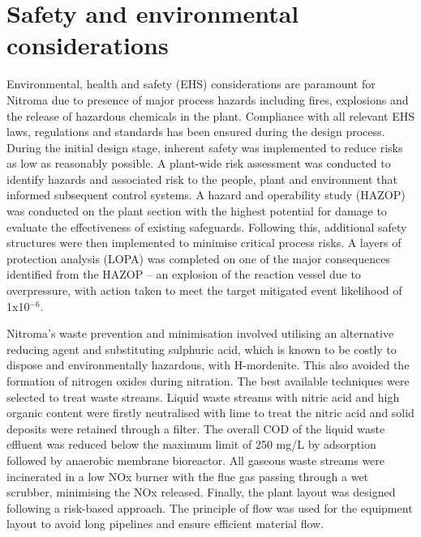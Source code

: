\section*{Safety and environmental considerations}

Environmental, health and safety (EHS) considerations are paramount for Nitroma due to presence of major process hazards including fires, explosions and the release of hazardous chemicals in the plant. Compliance with all relevant EHS laws, regulations and standards has been ensured during the design process.  During the initial design stage, inherent safety was implemented to reduce risks as low as reasonably possible. A plant-wide risk assessment was conducted to identify hazards and associated risk to the people, plant and environment that informed subsequent control systems. A hazard and operability study (HAZOP) was conducted on the plant section with the highest potential for damage to evaluate the effectiveness of existing safeguards. Following this, additional safety structures were then implemented to minimise critical process risks. A layers of protection analysis (LOPA) was completed on one of the major consequences identified from the HAZOP – an explosion of the reaction vessel due to overpressure, with action taken to meet the target mitigated event likelihood of 1x10$^{-6}$.  

Nitroma's waste prevention and minimisation involved utilising an alternative reducing agent and substituting sulphuric acid, which is known to be costly to dispose and environmentally hazardous, with H-mordenite. This also avoided the formation of nitrogen oxides during nitration. The best available techniques  were selected to treat waste streams. Liquid waste streams with nitric acid and high organic content were firstly neutralised with lime to treat the nitric acid and solid deposits were retained through a filter. The overall COD of the liquid waste effluent was reduced below the maximum limit of 250 mg/L by adsorption followed by anaerobic membrane bioreactor. All gaseous waste streams were incinerated in a low NOx burner with the flue gas passing through a wet scrubber, minimising the NOx released. Finally, the plant layout was designed following a risk-based approach. The principle of flow was used for the equipment layout to avoid long pipelines and ensure efficient material flow. 